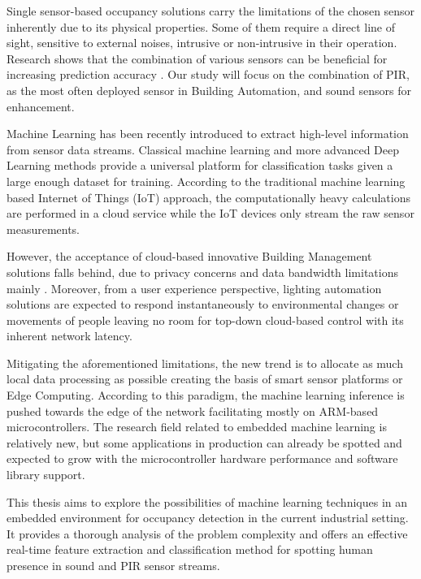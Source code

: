 Single sensor-based occupancy solutions carry the limitations of the chosen sensor inherently due to its physical properties. Some of them require a direct line of sight, sensitive to external noises, intrusive or non-intrusive in their operation. Research shows that the combination of various sensors can be beneficial for increasing prediction accuracy \cite{UCI_occ_dataset_pred, UCI_autoencoder, UCI_nn_real_time, Yang12multisensor_aud}. Our study will focus on the combination of PIR, as the most often deployed sensor in Building Automation, and sound sensors for enhancement.

Machine Learning has been recently introduced to extract high-level information from sensor data streams. Classical machine learning and more advanced Deep Learning methods provide a universal platform for classification tasks given a large enough dataset for training. According to the traditional machine learning based Internet of Things (IoT) approach, the computationally heavy calculations are performed in a cloud service while the IoT devices only stream the raw sensor measurements.


However, the acceptance of cloud-based innovative Building Management solutions falls behind, due to privacy concerns and data bandwidth limitations mainly \cite{yu2016iot}. Moreover, from a user experience perspective, lighting automation solutions are expected to respond instantaneously to environmental changes or movements of people leaving no room for top-down cloud-based control with its inherent network latency.

Mitigating the aforementioned limitations, the new trend is to allocate as much local data processing as possible creating the basis of smart sensor platforms or Edge Computing. According to this paradigm, the machine learning inference is pushed towards the edge of the network facilitating mostly on ARM-based microcontrollers. The research field related to embedded machine learning is relatively new, but some applications in production can already be spotted and expected to grow with the microcontroller hardware performance and software library support.

This thesis aims to explore the possibilities of machine learning techniques in an embedded environment for occupancy detection in the current industrial setting. It provides a thorough analysis of the problem complexity and offers an effective real-time feature extraction and classification method for spotting human presence in sound and PIR sensor streams. 



